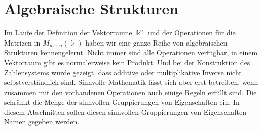 %
%
%
\section{Algebraische Strukturen
\label{buch:section:algebraische-Strukturen}}
Im Laufe der Definition der Vektorräume $\Bbbk^n$ und der
Operationen für die Matrizen in $M_{m\times n}(\Bbbk)$ haben
wir eine ganze Reihe von algebraischen Strukturen kennengelernt.
Nicht immer sind alle Operationen verfügbar, in einem Vektorraum
gibt es normalerweise kein Produkt.
Und bei der Konstruktion des Zahlensystems wurde gezeigt, dass
additive oder multiplikative Inverse nicht selbstverständlich
sind.
Sinnvolle Mathematik lässt sich aber erst betreiben, wenn zusammen
mit den vorhandenen Operationen auch einige Regeln erfüllt sind.
Die schränkt die Menge der sinnvollen Gruppierungen von Eigenschaften
ein.
In diesem Abschnitten sollen diesen sinnvollen Gruppierungen von
Eigenschaften Namen gegeben werden.







